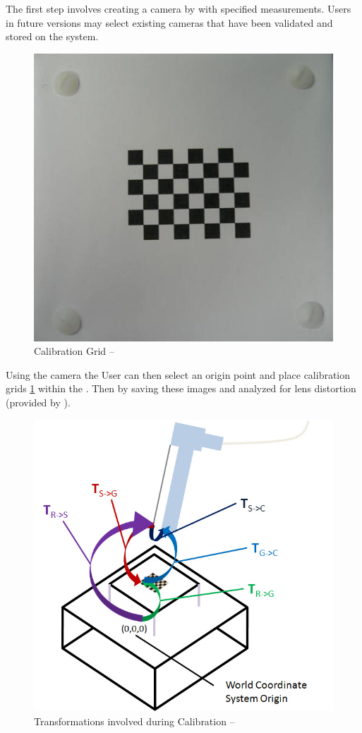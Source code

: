 \documentclass[11pt]{report}
\begin{document}
The first step involves creating a camera by with specified measurements. Users in future versions may select existing cameras that have been validated and stored on the system. 


\begin{figure}[htp]
\centering
\includegraphics[scale=0.45]{images/board.png}
\caption{Calibration Grid --\cite{CC}}
\label{fig:grid}
\end{figure}

Using the camera the User can then select an origin point and place calibration grids \ref{fig:grid} within the . Then by saving these images and analyzed for lens distortion (provided by ). 


\begin{figure}[htp]
\centering
\includegraphics[scale=0.45]{images/Coordinates.png}
\caption{Transformations involved during Calibration --\cite{CC}}
\label{fig:coord}
\end{figure}
\end{document}
